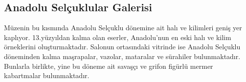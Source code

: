 \subsection{Anadolu Selçuklular Galerisi}
\indent\indent Müzenin bu kısmında Anadolu Selçuklu dönemine ait halı ve kilimleri geniş yer kaplıyor. 13.yüzyıldan kalma olan eserler, Anadolu'nun en eski halı ve kilim örneklerini oluşturmaktadır. Salonun ortasındaki vitrinde ise Anadolu Selçuklu döneminden kalma maşrapalar, vazolar, mataralar ve sürahiler bulunmaktadır. Bunlarla birlikte, yine bu döneme ait savaşçı ve grifon figürlü mermer kabartmalar bulunmaktadır.\newline
\begin{figure}[H]
    \centering
\end{figure}
